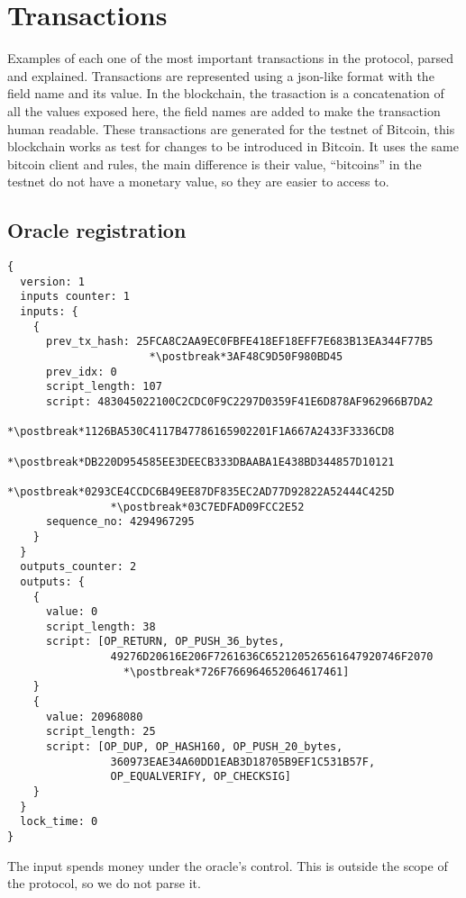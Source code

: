 \section{Transactions} \label{sec:appendix_transactions}
Examples of each one of the most important transactions in the protocol,
  parsed and explained.
Transactions are represented using a json-like format with the field name
  and its value.
In the blockchain, the trasaction is a concatenation of all the values
  exposed here, the field names are added to make the transaction human
  readable.
These transactions are generated for the testnet of Bitcoin, this blockchain
  works as test for changes to be introduced in Bitcoin.
It uses the same bitcoin client and rules, the main difference is their value,
  ``bitcoins'' in the testnet do not have a monetary value, so they are easier
  to access to.

\lstset{%
  basicstyle=\ttfamily,
  columns=fullflexible,
  tabsize=2,
  linewidth=10cm,
  escapechar=*,
}
\newcommand{\postbreak}[0]{\mbox{\textcolor{red}{$\hookrightarrow$}\space}}
\subsection{Oracle registration}
\begin{lstlisting}
{
  version: 1
  inputs counter: 1
  inputs: {
    {
      prev_tx_hash: 25FCA8C2AA9EC0FBFE418EF18EFF7E683B13EA344F77B5
                      *\postbreak*3AF48C9D50F980BD45
      prev_idx: 0
      script_length: 107
      script: 483045022100C2CDC0F9C2297D0359F41E6D878AF962966B7DA2
                *\postbreak*1126BA530C4117B47786165902201F1A667A2433F3336CD8
                *\postbreak*DB220D954585EE3DEECB333DBAABA1E438BD344857D10121
                *\postbreak*0293CE4CCDC6B49EE87DF835EC2AD77D92822A52444C425D
                *\postbreak*03C7EDFAD09FCC2E52
      sequence_no: 4294967295
    }
  }
  outputs_counter: 2
  outputs: {
    {
      value: 0
      script_length: 38
      script: [OP_RETURN, OP_PUSH_36_bytes,
                49276D20616E206F7261636C652120526561647920746F2070
                  *\postbreak*726F766964652064617461]
    }
    {
      value: 20968080
      script_length: 25
      script: [OP_DUP, OP_HASH160, OP_PUSH_20_bytes,
                360973EAE34A60DD1EAB3D18705B9EF1C531B57F,
                OP_EQUALVERIFY, OP_CHECKSIG]
    }
  }
  lock_time: 0
}
\end{lstlisting}

The input spends money under the oracle's control. This is outside the scope
  of the protocol, so we do not parse it.

